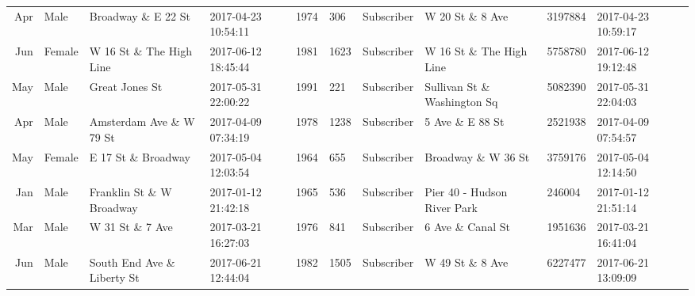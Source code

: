 \documentclass[11pt]{article}
\begin{document}
\begin{tabular}{r|llllllllll}
	 Apr                           & Male                          & Broadway \& E 22 St          & 2017-04-23 10:54:11           & 1974                          &  306                          & Subscriber                    & W 20 St \& 8 Ave             & 3197884                       & 2017-04-23 10:59:17          \\
	 Jun                           & Female                        & W 16 St \& The High Line     & 2017-06-12 18:45:44           & 1981                          & 1623                          & Subscriber                    & W 16 St \& The High Line     & 5758780                       & 2017-06-12 19:12:48          \\
	 May                           & Male                          & Great Jones St                & 2017-05-31 22:00:22           & 1991                          &  221                          & Subscriber                    & Sullivan St \& Washington Sq & 5082390                       & 2017-05-31 22:04:03          \\
	 Apr                           & Male                          & Amsterdam Ave \& W 79 St     & 2017-04-09 07:34:19           & 1978                          & 1238                          & Subscriber                    & 5 Ave \& E 88 St             & 2521938                       & 2017-04-09 07:54:57          \\
	 May                           & Female                        & E 17 St \& Broadway          & 2017-05-04 12:03:54           & 1964                          &  655                          & Subscriber                    & Broadway \& W 36 St          & 3759176                       & 2017-05-04 12:14:50          \\
	 Jan                          & Male                         & Franklin St \& W Broadway   & 2017-01-12 21:42:18          & 1965                         &  536                         & Subscriber                   & Pier 40 - Hudson River Park  &  246004                      & 2017-01-12 21:51:14         \\
	 Mar                           & Male                          & W 31 St \& 7 Ave             & 2017-03-21 16:27:03           & 1976                          &  841                          & Subscriber                    & 6 Ave \& Canal St            & 1951636                       & 2017-03-21 16:41:04          \\
	 Jun                           & Male                          & South End Ave \& Liberty St  & 2017-06-21 12:44:04           & 1982                          & 1505                          & Subscriber                    & W 49 St \& 8 Ave             & 6227477                       & 2017-06-21 13:09:09          \\

\end{tabular}
\end{document}
